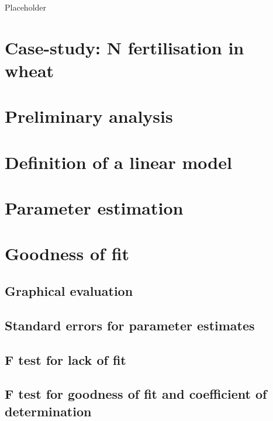 \documentclass[a4paper,12pt,oneside]{book}
\begin{document}
Placeholder

\hypertarget{case-study-n-fertilisation-in-wheat}{%
\section{Case-study: N fertilisation in wheat}\label{case-study-n-fertilisation-in-wheat}}

\hypertarget{preliminary-analysis}{%
\section{Preliminary analysis}\label{preliminary-analysis}}

\hypertarget{definition-of-a-linear-model}{%
\section{Definition of a linear model}\label{definition-of-a-linear-model}}

\hypertarget{parameter-estimation-2}{%
\section{Parameter estimation}\label{parameter-estimation-2}}

\hypertarget{goodness-of-fit}{%
\section{Goodness of fit}\label{goodness-of-fit}}

\hypertarget{graphical-evaluation}{%
\subsection{Graphical evaluation}\label{graphical-evaluation}}

\hypertarget{standard-errors-for-parameter-estimates}{%
\subsection{Standard errors for parameter estimates}\label{standard-errors-for-parameter-estimates}}

\hypertarget{f-test-for-lack-of-fit}{%
\subsection{F test for lack of fit}\label{f-test-for-lack-of-fit}}

\hypertarget{f-test-for-goodness-of-fit-and-coefficient-of-determination}{%
\subsection{F test for goodness of fit and coefficient of determination}\label{f-test-for-goodness-of-fit-and-coefficient-of-determination}}
\end{document}
